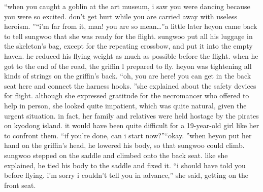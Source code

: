 “when you caught a goblin at the art museum, i saw you were dancing because you were so excited.
 don’t get hurt while you are carried away with useless heroism.
”“i’m far from it, man! you are so mean…”a little later heyon came back to tell sungwoo that she was ready for the flight.
sungwoo put all his luggage in the skeleton’s bag, except for the repeating crossbow, and put it into the empty haven.
 he reduced his flying weight as much as possible before the flight.
when he got to the end of the road, the griffin l prepared to fly.
 heyon was tightening all kinds of strings on the griffin’s back.
“oh, you are here! you can get in the back seat here and connect the harness hooks.
”she explained about the safety devices for flight.
 although she expressed gratitude for the necromancer who offered to help in person, she looked quite impatient, which was quite natural, given the urgent situation.
in fact, her family and relatives were held hostage by the pirates on kyodong island.
 it would have been quite difficult for a 19-year-old girl like her to confront them.
“if you’re done, can i start now?”“okay.
”when heyon put her hand on the griffin’s head, he lowered his body, so that sungwoo could climb.
sungwoo stepped on the saddle and climbed onto the back seat.
 like she explained, he tied his body to the saddle and fixed it.
“i should have told you before flying.
 i’m sorry i couldn’t tell you in advance,” she said, getting on the front seat.


 